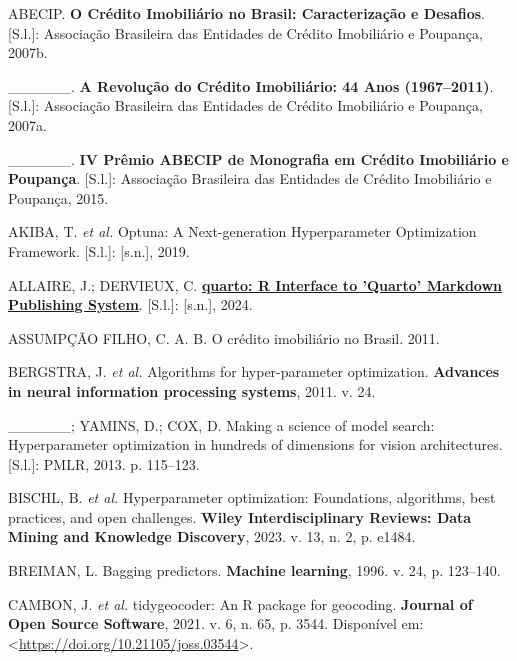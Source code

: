 \documentclass[
  12pt,
  a4paper,
]{scrreprt}
\newlength{\cslhangindent}
\newenvironment{CSLReferences}[2] %
 {\begin{list}{}{%
  \setlength{\itemindent}{0pt}
  \setlength{\leftmargin}{0pt}
  \setlength{\parsep}{0pt}
  \ifodd #1
   \setlength{\leftmargin}{\cslhangindent}
   \setlength{\itemindent}{-1\cslhangindent}
  \fi
  \setlength{\itemsep}{#2\baselineskip}}}
 {\end{list}}
\begin{document}
\label{refs}
\begin{CSLReferences}{0}{1}
ABECIP. \textbf{O Crédito Imobiliário no Brasil: Caracterização e
Desafios}. {[}S.l.{]}: Associação Brasileira das Entidades de Crédito
Imobiliário e Poupança, 2007b.

\_\_\_\_\_\_. \textbf{A Revolução do Crédito Imobiliário: 44 Anos
(1967--2011)}. {[}S.l.{]}: Associação Brasileira das Entidades de
Crédito Imobiliário e Poupança, 2007a.

\_\_\_\_\_\_. \textbf{IV Prêmio ABECIP de Monografia em Crédito
Imobiliário e Poupança}. {[}S.l.{]}: Associação Brasileira das Entidades
de Crédito Imobiliário e Poupança, 2015.

AKIBA, T. \emph{et al.} Optuna: A Next-generation Hyperparameter
Optimization Framework. {[}S.l.{]}: {[}s.n.{]}, 2019.

ALLAIRE, J.; DERVIEUX, C.
\textbf{\href{https://CRAN.R-project.org/package=quarto}{quarto: R
Interface to 'Quarto' Markdown Publishing System}}. {[}S.l.{]}:
{[}s.n.{]}, 2024.

ASSUMPÇÃO FILHO, C. A. B. O cr{é}dito imobili{á}rio no Brasil. 2011.

BERGSTRA, J. \emph{et al.} Algorithms for hyper-parameter optimization.
\textbf{Advances in neural information processing systems}, 2011. v. 24.

\_\_\_\_\_\_; YAMINS, D.; COX, D. Making a science of model search:
Hyperparameter optimization in hundreds of dimensions for vision
architectures. {[}S.l.{]}: PMLR, 2013. p. 115--123.

BISCHL, B. \emph{et al.} Hyperparameter optimization: Foundations,
algorithms, best practices, and open challenges. \textbf{Wiley
Interdisciplinary Reviews: Data Mining and Knowledge Discovery}, 2023.
v. 13, n. 2, p. e1484.

BREIMAN, L. Bagging predictors. \textbf{Machine learning}, 1996. v. 24,
p. 123--140.

CAMBON, J. \emph{et al.} tidygeocoder: An R package for geocoding.
\textbf{Journal of Open Source Software}, 2021. v. 6, n. 65, p. 3544.
Disponível em:
\textless{}\url{https://doi.org/10.21105/joss.03544}\textgreater.


\end{CSLReferences}
\end{document}
